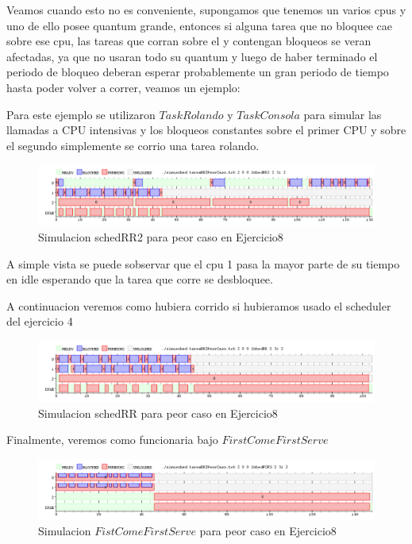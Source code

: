 \documentclass[11pt]{article}
\begin{document}
Veamos cuando esto no es conveniente, supongamos que tenemos un varios cpus y uno de ello posee quantum grande, entonces si alguna tarea que no bloquee cae sobre ese cpu, las tareas que corran sobre el y contengan bloqueos se veran afectadas, ya que no usaran todo su quantum y luego de haber terminado el periodo de bloqueo deberan esperar probablemente un gran periodo de tiempo hasta poder volver a correr, veamos un ejemplo: 

Para este ejemplo se utilizaron $TaskRolando$ y $TaskConsola$ para simular las llamadas a CPU intensivas y los bloqueos constantes sobre el primer CPU y sobre el segundo simplemente se corrio una tarea rolando.

  \begin{figure}[H]
    \includegraphics[scale=0.5]{Ej8PeorCaso}
    \caption{Simulacion schedRR2 para peor caso en Ejercicio8}
  \end{figure}

A simple vista se puede sobservar que el cpu 1 pasa la mayor parte de su tiempo en idle esperando que la tarea que corre se desbloquee. 

A continuacion veremos como hubiera corrido si hubieramos usado el scheduler del ejercicio 4

  \begin{figure}[H]
    \includegraphics[scale=0.5]{Ej8PeorCasoRR}
    \caption{Simulacion schedRR para peor caso en Ejercicio8}
  \end{figure}

Finalmente, veremos como funcionaria bajo $First Come First Serve$

  \begin{figure}[H]
    \includegraphics[scale=0.5]{Ej8PeorCasoFCFS}
    \caption{Simulacion $Fist Come First Serve$ para peor caso en Ejercicio8}
  \end{figure}
\end{document}
